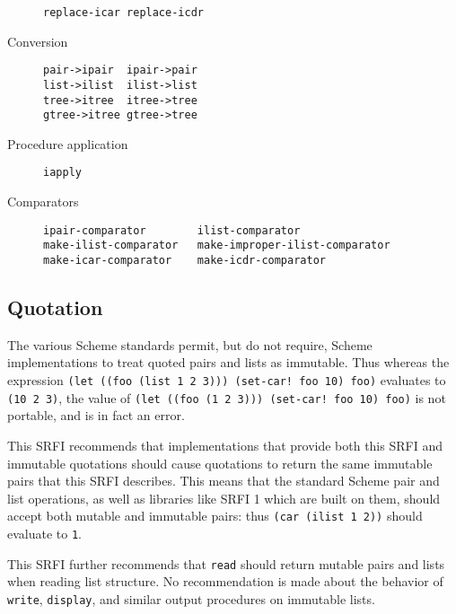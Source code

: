 \begin{description}
\begin{verbatim}
replace-icar replace-icdr
\end{verbatim}
\item[ Conversion ]
\begin{verbatim}
pair->ipair  ipair->pair
list->ilist  ilist->list
tree->itree  itree->tree
gtree->itree gtree->tree
\end{verbatim}
\item[ Procedure application ]
\begin{verbatim}
iapply
\end{verbatim}
\item[ Comparators ]
\begin{verbatim}
ipair-comparator        ilist-comparator
make-ilist-comparator   make-improper-ilist-comparator
make-icar-comparator    make-icdr-comparator
\end{verbatim}
\end{description}


\subsection{{Quotation}}\label{quotation}


The various Scheme standards permit, but do not require, Scheme
implementations to treat quoted pairs and lists as immutable. Thus
whereas the expression
\texttt{(let\ ((foo\ (list\ 1\ 2\ 3)))\ (set-car!\ foo\ 10)\ foo)}
evaluates to \texttt{(10\ 2\ 3)}, the value of
\texttt{(let\ ((foo\ \textquotesingle{}(1\ 2\ 3)))\ (set-car!\ foo\ 10)\ foo)}
is not portable, and is in fact an error.

This SRFI recommends that implementations that provide both this SRFI
and immutable quotations should cause quotations to return the same
immutable pairs that this SRFI describes. This means that the standard
Scheme pair and list operations, as well as libraries like SRFI 1 which
are built on them, should accept both mutable and immutable pairs: thus
\texttt{(car\ (ilist\ 1\ 2))} should evaluate to \texttt{1}.

This SRFI further recommends that \texttt{read} should return mutable
pairs and lists when reading list structure. No recommendation is made
about the behavior of \texttt{write}, \texttt{display}, and similar
output procedures on immutable lists.

